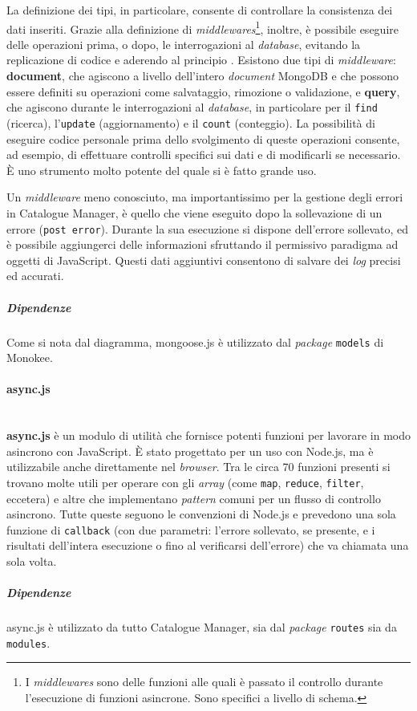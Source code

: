 La definizione dei tipi, in particolare, consente di controllare la consistenza dei dati inseriti. Grazie alla definizione di \textit{middlewares}\footnote{I \textit{middlewares} sono delle funzioni alle quali è passato il controllo durante l'esecuzione di funzioni asincrone. Sono specifici a livello di schema.}, inoltre, è possibile eseguire delle operazioni prima, o dopo, le interrogazioni al \textit{database}, evitando la replicazione di codice e aderendo al principio . Esistono due tipi di \textit{middleware}: \textbf{document}, che agiscono a livello dell'intero \textit{document} MongoDB e che possono essere definiti su operazioni come salvataggio, rimozione o validazione, e \textbf{query}, che agiscono durante le interrogazioni al \textit{database}, in particolare per il \texttt{find} (ricerca), l'\texttt{update} (aggiornamento) e il \texttt{count} (conteggio). La possibilità di eseguire codice personale prima dello svolgimento di queste operazioni consente, ad esempio, di effettuare controlli specifici sui dati e di modificarli se necessario. È uno strumento molto potente del quale si è fatto grande uso.

Un \textit{middleware} meno conosciuto, ma importantissimo per la gestione degli errori in Catalogue Manager, è quello che viene eseguito dopo la sollevazione di un errore (\texttt{post error}). Durante la sua esecuzione si dispone dell'errore sollevato, ed è possibile aggiungerci delle informazioni sfruttando il permissivo paradigma ad oggetti di JavaScript. Questi dati aggiuntivi consentono di salvare dei \textit{log} precisi ed accurati.
\subparagraph{Dipendenze}
Come si nota dal diagramma, mongoose.js è utilizzato dal \textit{package} \texttt{models} di Monokee.

\paragraph{async.js} \mbox{} \\
\textbf{async.js} è un modulo di utilità che fornisce potenti funzioni per lavorare in modo asincrono con JavaScript. È stato progettato per un uso con Node.js, ma è utilizzabile anche direttamente nel \textit{browser}. Tra le circa 70 funzioni presenti si trovano molte utili per operare con gli \textit{array} (come \texttt{map}, \texttt{reduce}, \texttt{filter}, eccetera) e altre che implementano \textit{pattern} comuni per un flusso di controllo asincrono. Tutte queste seguono le convenzioni di Node.js e prevedono una sola funzione di \texttt{callback} (con due parametri: l'errore sollevato, se presente, e i risultati dell'intera esecuzione o fino al verificarsi dell'errore) che va chiamata una sola volta.
\subparagraph{Dipendenze}
async.js è utilizzato da tutto Catalogue Manager, sia dal \textit{package} \texttt{routes} sia da \texttt{modules}.

